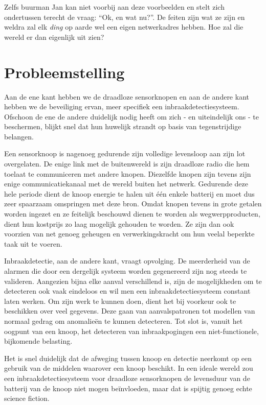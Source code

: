 \documentclass[12pt,a4paper]{article}
\begin{document}
Zelfs buurman Jan kan niet voorbij aan deze voorbeelden en stelt zich
ondertussen terecht de vraag: ``Ok, en wat nu?''. De feiten zijn wat ze zijn en
weldra zal elk \emph{ding} op aarde wel een eigen netwerkadres hebben. Hoe zal
die wereld er dan eigenlijk uit zien?

\section*{Probleemstelling}

Aan de ene kant hebben we de draadloze sensorknopen en aan de andere kant
hebben we de beveiliging ervan, meer specifiek een inbraakdetectiesysteem.
Ofschoon de ene de andere duidelijk nodig heeft om zich - en uiteindelijk ons -
te beschermen, blijkt snel dat hun huwelijk strandt op basis van tegenstrijdige
belangen.

Een sensorknoop is nagenoeg gedurende zijn volledige levensloop aan zijn lot
overgelaten. De enige link met de buitenwereld is zijn draadloze radio die hem
toelaat te communiceren met andere knopen. Diezelfde knopen zijn tevens zijn
enige communicatiekanaal met de wereld buiten het netwerk. Gedurende deze hele
periode dient de knoop energie te halen uit \'e\'en enkele batterij en moet dus
zeer spaarzaam omspringen met deze bron. Omdat knopen tevens in grote getalen
worden ingezet en ze feitelijk beschouwd dienen te worden als wegwerpproducten,
dient hun kostprijs zo laag mogelijk gehouden te worden. Ze zijn dan ook
voorzien van net genoeg geheugen en verwerkingskracht om hun veelal beperkte
taak uit te voeren.

Inbraakdetectie, aan de andere kant, vraagt opvolging. De meerderheid van de
alarmen die door een dergelijk systeem worden gegenereerd zijn nog steeds te
valideren. Aangezien bijna elke aanval verschillend is, zijn de mogelijkheden
om te detecteren ook vaak eindeloos en wil men een inbraakdetectiesysteem
constant laten werken. Om zijn werk te kunnen doen, dient het bij voorkeur ook
te beschikken over veel gegevens. Deze gaan van aanvalspatronen tot modellen
van normaal gedrag om anomalie\"en te kunnen detecteren. Tot slot is, vanuit
het oogpunt van een knoop, het detecteren van inbraakpogingen een
niet-functionele, bijkomende belasting.

Het is snel duidelijk dat de afweging tussen knoop en detectie neerkomt op een
gebruik van de middelen waarover een knoop beschikt. In een ideale wereld zou
een inbraakdetectiesysteem voor draadloze sensorknopen de levensduur van de
batterij van de knoop niet mogen be\"invloeden, maar dat is spijtig genoeg
echte science fiction.
\end{document}
